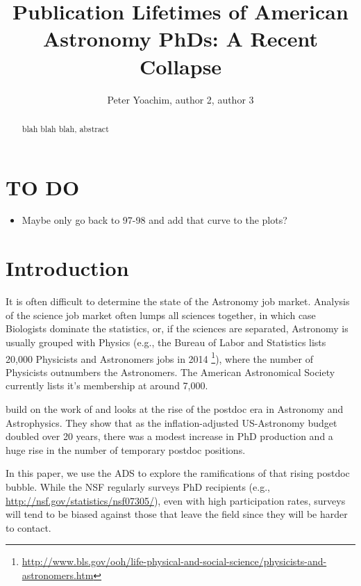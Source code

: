 \documentclass{emulateapj}
\begin{document}
\title{Publication Lifetimes of American Astronomy PhDs: A Recent Collapse}

\author{Peter Yoachim, author 2, author 3 
  }


\begin{abstract}
blah blah blah, abstract

\end{abstract}


\section{TO DO}
\begin{itemize}
  \item{Maybe only go back to 97-98 and add that curve to the plots? }
\end{itemize}

\section{Introduction}

It is often difficult to determine the state of the Astronomy job market.  Analysis of the science job market often lumps all sciences together, in which case Biologists dominate the statistics, or, if the sciences are separated, Astronomy is usually grouped with Physics (e.g., the Bureau of Labor and Statistics lists 20,000 Physicists and Astronomers jobs in 2014 \footnote{\url{http://www.bls.gov/ooh/life-physical-and-social-science/physicists-and-astronomers.htm}}), where the number of Physicists outnumbers the Astronomers.  The American Astronomical Society currently lists it's membership at around 7,000.

\citet{Seth09} build on the work of \citet{Metcalfe08} and looks at the rise of the postdoc era in Astronomy and Astrophysics.  They show that as the inflation-adjusted US-Astronomy budget doubled over 20 years, there was a modest increase in PhD production and a huge rise in the number of temporary postdoc positions.

In this paper, we use the ADS to explore the ramifications of that rising postdoc bubble.  While the NSF regularly surveys PhD recipients (e.g., \url{http://nsf.gov/statistics/nsf07305/}), even with high participation rates, surveys will tend to be biased against those that leave the field since they will be harder to contact.
\end{document}
